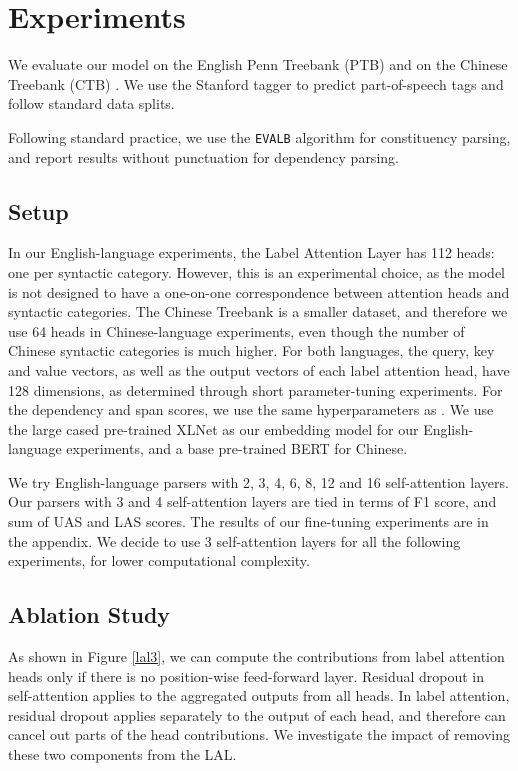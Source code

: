 \documentclass[11pt,a4paper]{article}
\begin{document}
\section{Experiments}
\label{section_exp}

We evaluate our model on the English Penn Treebank (PTB) \cite{marcus1993building} and on the Chinese Treebank (CTB) \cite{xue2005penn}. We use the Stanford tagger \cite{toutanova2003feature} to predict part-of-speech tags and follow standard data splits.

Following standard practice, we use the \texttt{EVALB} algorithm \cite{sekine1997evalb} for constituency parsing, and report results without punctuation for dependency parsing.

\subsection{Setup}
In our English-language experiments, the Label Attention Layer has 112 heads: one per syntactic category. However, this is an experimental choice, as the model is not designed to have a one-on-one correspondence between attention heads and syntactic categories. The Chinese Treebank is a smaller dataset, and therefore we use 64 heads in Chinese-language experiments, even though the number of Chinese syntactic categories is much higher. For both languages, the query, key and value vectors, as well as the output vectors of each label attention head, have 128 dimensions, as determined through short parameter-tuning experiments. For the dependency and span scores, we use the same hyperparameters as \citet{zhou2019head}. We use the large cased pre-trained XLNet \cite{yang2019xlnet} as our embedding model for our English-language experiments, and a base pre-trained BERT \cite{devlin2018bert} for Chinese. 

We try English-language parsers with 2, 3, 4, 6, 8, 12 and 16 self-attention layers. Our parsers with 3 and 4 self-attention layers are tied in terms of F1 score, and sum of UAS and LAS scores. The results of our fine-tuning experiments are in the appendix. We decide to use 3 self-attention layers for all the following experiments, for lower computational complexity.

\subsection{Ablation Study}

As shown in Figure \ref{lal3}, we can compute the contributions from label attention heads only if there is no position-wise feed-forward layer. Residual dropout in self-attention applies to the aggregated outputs from all heads. In label attention, residual dropout applies separately to the output of each head, and therefore can cancel out parts of the head contributions. We investigate the impact of removing these two components from the LAL.
\end{document}
